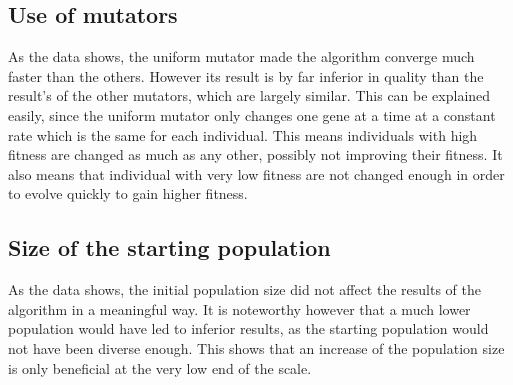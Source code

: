 \documentclass[a4paper,10pt]{article}
\begin{document}
\subsection{Use of mutators}
As the data shows, the uniform mutator made the algorithm converge much faster than the others. However its result is by far inferior in quality than the result's of the other mutators, which are largely similar. This can be explained easily, since the uniform mutator only changes one gene at a time at a constant rate which is the same for each individual. This means individuals with high fitness are changed as much as any other, possibly not improving their fitness. It also means that individual with very low fitness are not changed enough in order to evolve quickly to gain higher fitness.
\subsection{Size of the starting population}
As the data shows, the initial population size did not affect the results of the algorithm in a meaningful way. It is noteworthy however that a much lower population would have led to inferior results, as the starting population would not have been diverse enough. This shows that an increase of the population size is only beneficial at the very low end of the scale.
\end{document}
